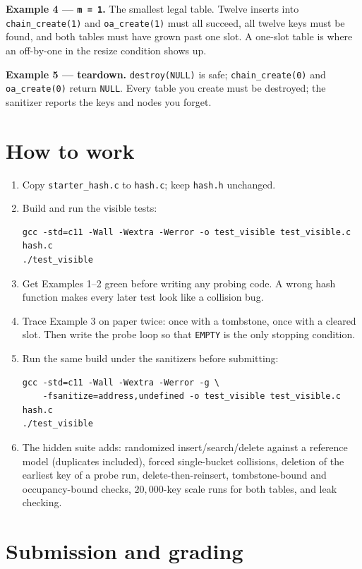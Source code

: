 \documentclass[11pt]{article}
\begin{document}
\textbf{Example 4 --- \texttt{m = 1}.} The smallest legal table. Twelve inserts into \texttt{chain\_create(1)} and \texttt{oa\_create(1)} must all succeed, all twelve keys must be found, and both tables must have grown past one slot. A one-slot table is where an off-by-one in the resize condition shows up.

\textbf{Example 5 --- teardown.} \texttt{destroy(NULL)} is safe; \texttt{chain\_create(0)} and \texttt{oa\_create(0)} return \texttt{NULL}. Every table you create must be destroyed; the sanitizer reports the keys and nodes you forget.

\section{How to work}

\begin{enumerate}
  \item Copy \texttt{starter\_hash.c} to \texttt{hash.c}; keep \texttt{hash.h} unchanged.
  \item Build and run the visible tests:
\begin{verbatim}
gcc -std=c11 -Wall -Wextra -Werror -o test_visible test_visible.c hash.c
./test_visible
\end{verbatim}
  \item Get Examples 1--2 green before writing any probing code. A wrong hash function makes every later test look like a collision bug.
  \item Trace Example 3 on paper twice: once with a tombstone, once with a cleared slot. Then write the probe loop so that \texttt{EMPTY} is the only stopping condition.
  \item Run the same build under the sanitizers before submitting:
\begin{verbatim}
gcc -std=c11 -Wall -Wextra -Werror -g \
    -fsanitize=address,undefined -o test_visible test_visible.c hash.c
./test_visible
\end{verbatim}
  \item The hidden suite adds: randomized insert/search/delete against a reference model (duplicates included), forced single-bucket collisions, deletion of the earliest key of a probe run, delete-then-reinsert, tombstone-bound and occupancy-bound checks, $20{,}000$-key scale runs for both tables, and leak checking.
\end{enumerate}

\section{Submission and grading}
\end{document}
